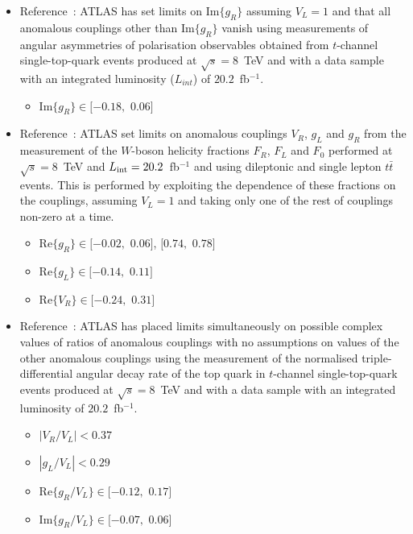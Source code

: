 \renewcommand\labelitemii{\textasteriskcentered} 
\begin{itemize}
\item Reference~\cite{Probing}: ATLAS has set limits on Im$\{g_R\}$ assuming $V_L=1$ and that all anomalous couplings other than Im$\{g_R\}$ vanish using measurements of angular asymmetries of polarisation observables obtained from $t$-channel single-top-quark events produced at $\sqrt{s}=8$~TeV and with a data sample with an integrated luminosity ($L_{int}$) of $20.2$~fb$^{-1}$.
	\begin{itemize}
	\item Im$\{g_R\} \in [-0.18,$ $0.06]$
	\end{itemize}



\item Reference~\cite{Aaboud:2016hsq}: ATLAS set limits on anomalous couplings $V_R$, $g_L$ and $g_R$ from the measurement of the $W$-boson helicity fractions $F_R$, $F_L$ and $F_0$ performed at $\sqrt{s}=8$~TeV and $L_{\rm int}=20.2$~fb$^{-1}$ and using dileptonic and single lepton $t\bar{t}$ events. This is performed by exploiting the dependence of these fractions on the couplings, assuming $V_L=1$ and taking only one of the rest of couplings non-zero at a time.
	\begin{itemize}
	\item Re$\{g_R\} \in [-0.02,$ $0.06]$, $[0.74,$ $0.78]$
	\item Re$\{g_L\} \in [-0.14,$ $0.11]$
	\item Re$\{V_R\} \in [-0.24,$ $0.31]$
	\end{itemize}


\item Reference~\cite{Aaboud:2017yqf}: ATLAS has placed limits simultaneously on possible complex values of ratios of anomalous couplings with no assumptions on values of the other anomalous couplings using the measurement of the normalised triple-differential angular decay rate of the top quark in $t$-channel single-top-quark events produced at $\sqrt{s}=8$~TeV and with a data sample with an integrated luminosity of $20.2$~fb$^{-1}$.
	\begin{itemize}
	\item $|V_{R}/V_{L}|<0.37$
	\item $|g_{L}/V_{L}|<0.29$
	\item Re$\{g_{R}/V_{L}\} \in [-0.12,$ $0.17]$
	\item Im$\{g_{R}/V_{L}\} \in [-0.07,$ $0.06]$
	\end{itemize}


\end{itemize}
